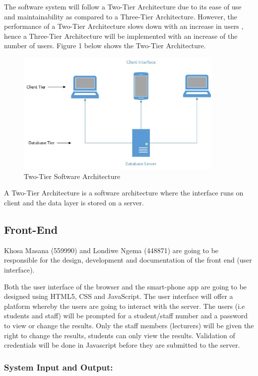 \documentclass[10pt,onecolumn]{RequimentsGathering}
\begin{document}
The software system will follow a Two-Tier Architecture due to its ease of use and maintainability as compared to a Three-Tier Architecture. However, the performance of a Two-Tier Architecture slows down with an increase in users \cite{ref3}, hence a Three-Tier Architecture will be implemented with an increase of the number of users. Figure 1 below shows the Two-Tier Architecture.   
\begin{center}
\begin{figure}[h]
\centering
\includegraphics[width=10cm]{Two-Tier}
\caption{Two-Tier Software Architecture}
\end{figure}
\end{center}


A Two-Tier Architecture is a software architecture where the interface runs on client and the data layer is stored on a server\cite{ref4}.
\subsection{Front-End}

Khosa Masana (559990) and Londiwe Ngema (448871) are going to be responsible for the design, development and documentation of the front end (user interface).

Both the user interface of the browser and the smart-phone app are going to be designed using HTML5, CSS and JavaScript. The user interface will offer a platform whereby the users are going to interact with the server. The users (i.e students and staff) will be prompted for a student/staff number and a password to view or change the results. Only the staff members (lecturers) will be given the right to change the results, students can only view the results. Validation of credentials will be done in Javascript before they are submitted to the server.  

\subsubsection{\textbf{System Input and Output:}} 
 
\end{document}
